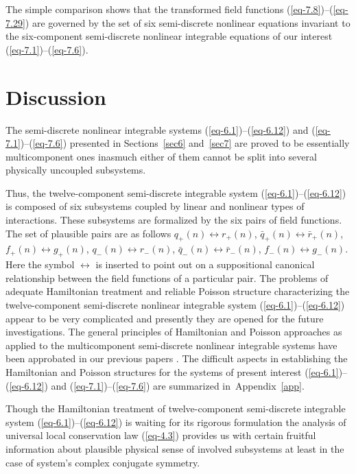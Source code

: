 \documentclass[pdftex]{sigma}
\numberwithin{equation}{section}
\begin{document}
The simple comparison shows that the transformed field functions (\ref{eq-7.8})--(\ref{eq-7.29}) are governed by the set of six semi-discrete nonlinear equations invariant to the six-component semi-discrete nonlinear integrable equations of our interest (\ref{eq-7.1})--(\ref{eq-7.6}).

\section{Discussion}

The semi-discrete nonlinear integrable systems (\ref{eq-6.1})--(\ref{eq-6.12}) and (\ref{eq-7.1})--(\ref{eq-7.6}) presented in Sections~\ref{sec6} and~\ref{sec7} are proved to be essentially multicomponent ones inasmuch either of them cannot be split into several physically uncoupled subsystems.

Thus, the twelve-component semi-discrete integrable system (\ref{eq-6.1})--(\ref{eq-6.12}) is composed of six subsystems coupled by linear and nonlinear types of interactions. These subsystems are formalized by the six pairs of field functions.
The set of plausible pairs are as follows
${q_{+}(n)\leftrightarrow r_{+}(n)}$, $\bar{q}_{+}(n)\leftrightarrow \bar{r}_{+}(n)$, $f_{+}(n)\leftrightarrow g_{+}(n)$, $q_{-}(n)\leftrightarrow r_{-}(n)$, $\bar{q}_{-}(n)\leftrightarrow \bar{r}_{-}(n)$, $f_{-}(n)\leftrightarrow g_{-}(n)$. Here the symbol $\leftrightarrow$ is inserted to point out on a suppositional canonical relationship between the field functions of a particular pair. The problems of adequate Hamiltonian treatment and reliable Poisson structure characterizing the twelve-component semi-discrete nonlinear integrable system (\ref{eq-6.1})--(\ref{eq-6.12})
appear to be very complicated and presently they are opened for the future investigations. The general principles of Hamiltonian and Poisson approaches as applied to the multicomponent semi-discrete nonlinear integrable systems have been approbated in our previous papers \cite{vakhnenko-JMP-56-033505, vakhnenko-JMP-57-113504,vakhnenko-JNMP-24-250, vakhnenko-JMP-59-053504, vakhnenko-LMP-108-1807}. The difficult aspects in establishing the Hamiltonian and Poisson structures for the systems of present interest (\ref{eq-6.1})--(\ref{eq-6.12}) and (\ref{eq-7.1})--(\ref{eq-7.6}) are summarized in~Appendix~\ref{app}.

Though the Hamiltonian treatment of twelve-component semi-discrete integrable system (\ref{eq-6.1})--(\ref{eq-6.12}) is waiting for its rigorous formulation the analysis of universal local conservation law (\ref{eq-4.3}) provides us with certain fruitful information about plausible physical sense of involved subsystems at least in the case of system's complex conjugate symmetry.
\end{document}

